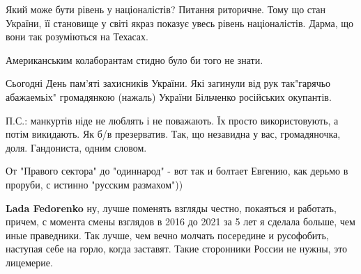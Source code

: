 \begin{itemize}
\begin{itemize}
 
Який може бути рівень у націоналістів?
Питання риторичне.
Тому що стан України, її становище у світі якраз показує увесь рівень націоналістів. Дарма, що вони так розуміються на Техасах.

 
Американським колаборантам стидно було би того не знати.

\end{itemize}

 

Сьогодні День пам'яті захисників України. Які загинули від рук так"гарячьо
абажаемьіх" громадянкою (нажаль) України Більченко російських окупантів.

П.С.: манкуртів ніде не люблять і не поважають. Їх просто використовують, а
потім викидають. Як б/в презерватив. Так, що незавидна у вас, громадяночка,
доля. Гандониста, одним словом.


 

От "Правого сектора" до "одиннарод" - вот так и болтает Евгению, как дерьмо в
проруби, с истинно "русским размахом"))

\begin{itemize}
 
\textbf{Lada Fedorenko} ну, лучше поменять взгляды честно, покаяться и работать, причем, с момента смены взглядов в 2016 до 2021 за 5 лет я сделала больше, чем иные праведники. Так лучше, чем вечно молчать посередине и русофобить, наступая себе на горло, когда заставят. Такие сторонники России не нужны, это лицемерие.


\end{itemize}
\end{itemize}
